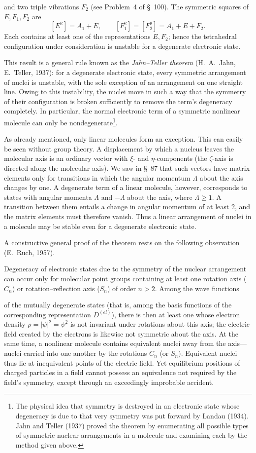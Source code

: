 and two triple vibrations $F_2$ (see Problem~4 of \S~100). The symmetric squares of $E,F_1,F_2$ are
\[
 [E^2]=A_1+E,\qquad [F_1^2]=[F_2^2]=A_1+E+F_2.
\]
Each contains at least one of the representations $E,F_2$; hence the tetrahedral configuration under consideration is unstable for a degenerate electronic state.

This result is a general rule known as the \emph{Jahn--Teller theorem} (H.~A.~Jahn, E.~Teller, 1937): for a degenerate electronic state, every symmetric arrangement of nuclei is unstable, with the sole exception of an arrangement on one straight line. Owing to this instability, the nuclei move in such a way that the symmetry of their configuration is broken sufficiently to remove the term's degeneracy completely. In particular, the normal electronic term of a symmetric nonlinear molecule can only be nondegenerate\footnote{The physical idea that symmetry is destroyed in an electronic state whose degeneracy is due to that very symmetry was put forward by Landau (1934). Jahn and Teller (1937) proved the theorem by enumerating all possible types of symmetric nuclear arrangements in a molecule and examining each by the method given above.}.

As already mentioned, only linear molecules form an exception. This can easily be seen without group theory. A displacement by which a nucleus leaves the molecular axis is an ordinary vector with $\xi$- and $\eta$-components (the $\zeta$-axis is directed along the molecular axis). We saw in \S~87 that such vectors have matrix elements only for transitions in which the angular momentum $\Lambda$ about the axis changes by one. A degenerate term of a linear molecule, however, corresponds to states with angular momenta $\Lambda$ and $-\Lambda$ about the axis, where $\Lambda\geqslant1$. A transition between them entails a change in angular momentum of at least 2, and the matrix elements must therefore vanish. Thus a linear arrangement of nuclei in a molecule may be stable even for a degenerate electronic state.

A constructive general proof of the theorem rests on the following observation (E.~Ruch, 1957).

Degeneracy of electronic states due to the symmetry of the nuclear arrangement can occur only for molecular point groups containing at least one rotation axis ($C_n$) or rotation--reflection axis ($S_n$) of order $n>2$. Among the wave functions

of the mutually degenerate states (that is, among the basis functions of the corresponding representation $D^{(el)}$), there is then at least one whose electron density $\rho=|\psi|^2=\psi^2$ is not invariant under rotations about this axis; the electric field created by the electrons is likewise not symmetric about the axis. At the same time, a nonlinear molecule contains equivalent nuclei away from the axis---nuclei carried into one another by the rotations $C_n$ (or $S_n$). Equivalent nuclei thus lie at inequivalent points of the electric field. Yet equilibrium positions of charged particles in a field cannot possess an equivalence not required by the field's symmetry, except through an exceedingly improbable accident.

